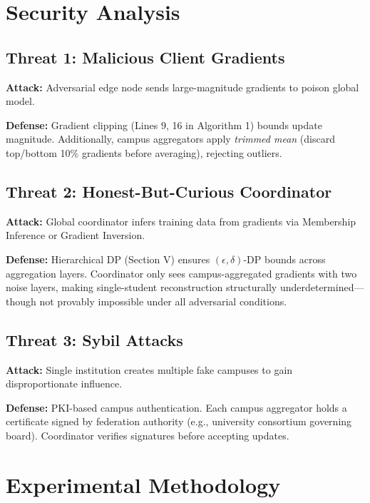 \documentclass[conference]{IEEEtran}
\begin{document}
\section{Security Analysis}

\subsection{Threat 1: Malicious Client Gradients}

\textbf{Attack:} Adversarial edge node sends large-magnitude gradients to poison global model.

\textbf{Defense:} Gradient clipping (Lines 9, 16 in Algorithm 1) bounds update magnitude. Additionally, campus aggregators apply \textit{trimmed mean} (discard top/bottom 10\% gradients before averaging), rejecting outliers.

\subsection{Threat 2: Honest-But-Curious Coordinator}

\textbf{Attack:} Global coordinator infers training data from gradients via Membership Inference or Gradient Inversion.

\textbf{Defense:} Hierarchical DP (Section V) ensures $(\epsilon, \delta)$-DP bounds across aggregation layers. Coordinator only sees campus-aggregated gradients with two noise layers, making single-student reconstruction structurally underdetermined---though not provably impossible under all adversarial conditions.

\subsection{Threat 3: Sybil Attacks}

\textbf{Attack:} Single institution creates multiple fake campuses to gain disproportionate influence.

\textbf{Defense:} PKI-based campus authentication. Each campus aggregator holds a certificate signed by federation authority (e.g., university consortium governing board). Coordinator verifies signatures before accepting updates.

\section{Experimental Methodology}
\end{document}
